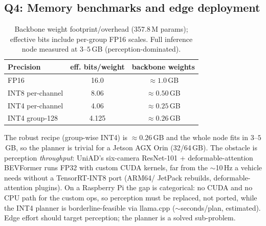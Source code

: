 \documentclass[11pt]{article}
\begin{document}
\subsection{Q4: Memory benchmarks and edge deployment}
\begin{table}[h]\centering
\caption{Backbone weight footprint/overhead (357.8\,M params); effective bits include per-group
FP16 scales. Full inference node measured at $3$--$5$\,GB (perception-dominated).}
\begin{tabular}{lcc}
\toprule
Precision & eff. bits/weight & backbone weights \\
\midrule
FP16 & 16.0 & $\approx 1.0$\,GB \\
INT8 per-channel & 8.06 & $\approx 0.50$\,GB \\
INT4 per-channel & 4.06 & $\approx 0.25$\,GB \\
INT4 group-128 & 4.125 & $\approx 0.26$\,GB \\
\bottomrule
\end{tabular}
\end{table}
The robust recipe (group-wise INT4) is $\approx 0.26$\,GB and the whole node fits in $3$--$5$\,GB, so
the planner is trivial for a Jetson AGX Orin (32/64\,GB). The obstacle is perception
\emph{throughput}: UniAD's six-camera ResNet-101 + deformable-attention BEVFormer runs FP32 with
custom CUDA kernels, far from the $\sim$10\,Hz a vehicle needs without a TensorRT-INT8 port (ARM64/
JetPack rebuilds, deformable-attention plugins). On a Raspberry Pi the gap is categorical: no CUDA
and no CPU path for the custom ops, so perception must be replaced, not ported, while the INT4
planner is borderline-feasible via llama.cpp ($\sim$seconds/plan, estimated). Edge effort should
target perception; the planner is a solved sub-problem.
\end{document}
